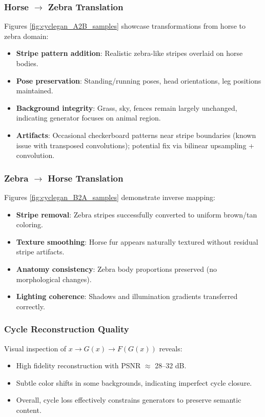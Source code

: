 \documentclass[11pt]{article}
\begin{document}
\subsubsection{Horse $\to$ Zebra Translation}
Figures \ref{fig:cyclegan_A2B_samples} showcase transformations from horse to zebra domain:
\begin{itemize}
\item \textbf{Stripe pattern addition}: Realistic zebra-like stripes overlaid on horse bodies.
\item \textbf{Pose preservation}: Standing/running poses, head orientations, leg positions maintained.
\item \textbf{Background integrity}: Grass, sky, fences remain largely unchanged, indicating generator focuses on animal region.
\item \textbf{Artifacts}: Occasional checkerboard patterns near stripe boundaries (known issue with transposed convolutions); potential fix via bilinear upsampling + convolution.
\end{itemize}

\subsubsection{Zebra $\to$ Horse Translation}
Figures \ref{fig:cyclegan_B2A_samples} demonstrate inverse mapping:
\begin{itemize}
\item \textbf{Stripe removal}: Zebra stripes successfully converted to uniform brown/tan coloring.
\item \textbf{Texture smoothing}: Horse fur appears naturally textured without residual stripe artifacts.
\item \textbf{Anatomy consistency}: Zebra body proportions preserved (no morphological changes).
\item \textbf{Lighting coherence}: Shadows and illumination gradients transferred correctly.
\end{itemize}

\subsubsection{Cycle Reconstruction Quality}
Visual inspection of $x \to G(x) \to F(G(x))$ reveals:
\begin{itemize}
\item High fidelity reconstruction with PSNR $\approx$ 28–32 dB.
\item Subtle color shifts in some backgrounds, indicating imperfect cycle closure.
\item Overall, cycle loss effectively constrains generators to preserve semantic content.
\end{itemize}
\end{document}
